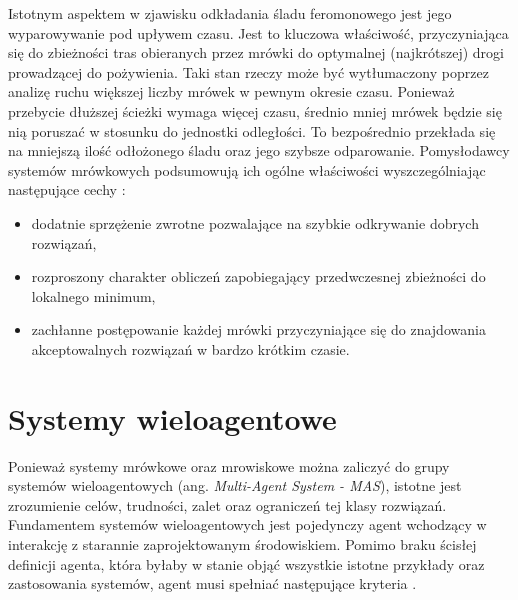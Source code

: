 {    Istotnym aspektem w zjawisku odkładania śladu feromonowego jest jego wyparowywanie pod upływem czasu. Jest to
    kluczowa właściwość, przyczyniająca się do zbieżności tras obieranych przez mrówki do optymalnej (najkrótszej) drogi
    prowadzącej do pożywienia. Taki stan rzeczy może być wytłumaczony poprzez analizę ruchu większej liczby mrówek w
    pewnym okresie czasu. Ponieważ przebycie dłuższej ścieżki wymaga więcej czasu, średnio mniej mrówek będzie się nią
    poruszać w stosunku do jednostki odległości. To bezpośrednio przekłada się na mniejszą ilość odłożonego śladu oraz
    jego szybsze odparowanie. Pomysłodawcy systemów mrówkowych podsumowują ich ogólne właściwości wyszczególniając
    następujące cechy \cite{Dorigo1991AntSA}:

    \begin{itemize}
        \item dodatnie sprzężenie zwrotne pozwalające na szybkie odkrywanie dobrych rozwiązań,
        \item rozproszony charakter obliczeń zapobiegający przedwczesnej zbieżności do lokalnego minimum,
        \item zachłanne postępowanie każdej mrówki przyczyniające się do znajdowania akceptowalnych rozwiązań w bardzo
        krótkim czasie.
    \end{itemize}


    \section{Systemy wieloagentowe}
    {
        Ponieważ systemy mrówkowe oraz mrowiskowe można zaliczyć do grupy systemów wieloagentowych (ang.
        \textit{Multi-Agent System - MAS}), istotne jest zrozumienie celów, trudności, zalet oraz ograniczeń tej klasy
        rozwiązań. Fundamentem systemów wieloagentowych jest pojedynczy agent wchodzący w interakcję z starannie
        zaprojektowanym środowiskiem. Pomimo braku ścisłej definicji agenta, która byłaby w stanie objąć wszystkie
        istotne przykłady oraz zastosowania systemów, agent musi spełniać następujące kryteria \cite{Balaji2010AnIT}.

}}
